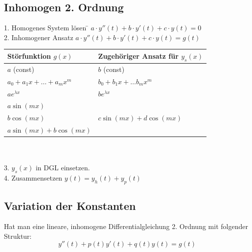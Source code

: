 \subsection{Inhomogen 2. Ordnung}
\begin{tabbing}
1. Homogenes System lösen \= $a \cdot y''(t) + b \cdot y'(t) + c \cdot y(t) = 0$\\
2. Inhomogener Ansatz \> $a \cdot y''(t) + b \cdot y'(t) + c \cdot y(t) = g(t)$\\
\>\begin{tabular}{|l|l|}
	\hline
	\textbf{Störfunktion $g(x)$} & \textbf{Zugehöriger Ansatz für $y_s(x)$} \\ \hline
	$a$ (const)					 & $b$ (const) \\ \hline
	$a_0 + a_1x + \dots + a_mx^m$& $b_0 + b_1x+ \dots  b_mx^m$ \\ \hline
	$ae^{\lambda x}$			 & $be^{\lambda x}$ \\ \hline
	$a \sin(mx)$ & \\ 
	$b \cos(mx)$				 & $c \sin(mx) + d \cos(mx)$ \\
	$a \sin(mx) + b \cos(mx)$ & \\ \hline
\end{tabular}\\ \\
3. $y_s(x)$ in DGL einsetzen. \\
4. Zusammensetzen \> $y(t)=y_h(t)+y_p(t)$
\end{tabbing}
\subsection{Variation der Konstanten}
Hat man eine lineare, inhomogene Differentialgleichung 2. Ordnung mit folgender Struktur:\\
\begin{equation*}
y''(t) + p(t)y'(t) + q(t)y(t) = g(t)
\end{equation*}

